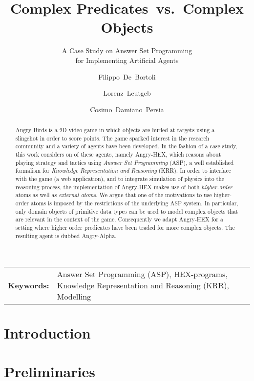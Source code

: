 \documentclass{llncs}
\title{Complex Predicates~vs.~Complex Objects}
\subtitle{A Case Study on Answer Set Programming\\ for Implementing Artificial Agents}
\author{Filippo~De~Bortoli \and Lorenz~Leutgeb \and Cosimo~Damiano~Persia}
\institute{International Center for Computational Logic, TU Dresden\\ \email{\{filippo.de\_bortoli,lorenz.leutgeb,cosimo\_damiano.persia\}@mailbox.tu-dresden.de}}
\newcommand{\ah}{Angry-HEX\xspace}
\begin{document}
\maketitle

\begin{abstract}
Angry Birds is a 2D video game in which objects are hurled at targets using a slingshot in order to score points. The game sparked interest in the research community and a variety of agents have been developed.
In the fashion of a case study, this work considers on of these agents, namely \ah, which reasons about playing strategy and tactics using \emph{Answer Set Programming} (ASP), a well established formalism for \emph{Knowledge Representation and Reasoning} (KRR).
In order to interface with the game (a web application), and to integrate simulation of physics into the reasoning process, the implementation of \ah makes use of both \emph{higher-order} atoms as well as \emph{external atoms}.
We argue that one of the motivations to use higher-order atoms is imposed by the restrictions of the underlying ASP system. In particular, only domain objects of primitive data types can be used to model complex objects that are relevant in the context of the game.
Consequently we adapt \ah for a setting where higher order predicates have been traded for more complex objects. The resulting agent is dubbed Angry-Alpha.
\end{abstract}

\begin{center}
\begin{tabular}{p{}p{}}
\bfseries{Keywords:} & Answer Set Programming (ASP), HEX-programs, Knowledge Representation and Reasoning (KRR), Modelling\\
\end{tabular}
\end{center}

\section{Introduction}
\label{sec:intro}


\section{Preliminaries}
\label{sec:prelim}


\end{document}

